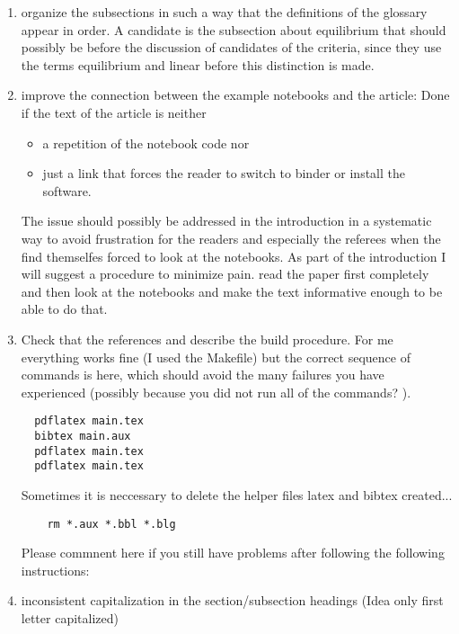 \begin{enumerate}
  \item
    organize the subsections in such a way that the definitions of the glossary appear in order. A candidate is the subsection about equilibrium that should possibly be before the discussion of candidates of the criteria, since they use the terms equilibrium and linear before this distinction is made.
 \item
  improve the connection between the example notebooks and the
  article: Done if the text of the article is neither
  \begin{itemize} \item a repetition of the notebook code nor \item
  just a link that forces the reader to switch to binder or install
  the software.  \end{itemize}
  
  The issue should possibly be addressed in the introduction in a systematic way to 
  avoid frustration for the readers and especially the referees when the find themselfes forced to look at the notebooks.
  As part of the introduction I will suggest a procedure to minimize pain.
  read the paper first completely and then look at the notebooks and make the text informative enough to be able to do that.
  \item
  Check that the references and describe the build procedure.
  For me everything works fine (I used the Makefile) but the correct sequence of commands is here, which should avoid the many failures you have experienced (possibly because you did not run all of the commands? ).
  \begin{verbatim}
  pdflatex main.tex
  bibtex main.aux
  pdflatex main.tex
  pdflatex main.tex
  \end{verbatim}
  Sometimes it is neccessary to delete the helper files latex and bibtex created...

  \begin{verbatim}
	rm *.aux *.bbl *.blg
  \end{verbatim}
  Please commnent here if you still have problems after following the following instructions:
  \item inconsistent capitalization in the section/subsection headings (Idea only first letter capitalized)

\end{enumerate}
